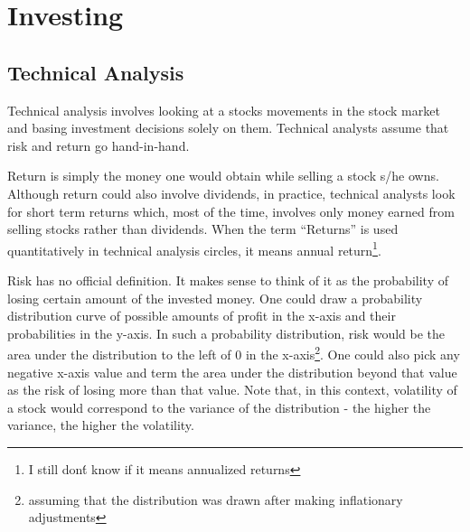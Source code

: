 \chapter{Investing}
\section{Technical Analysis}
Technical analysis involves looking at a stocks movements in the stock market and basing investment decisions solely on them. Technical analysts assume that risk and return go hand-in-hand. 

Return is simply the money one would obtain while selling a stock s/he owns. Although return could also involve dividends, in practice, technical analysts look for short term returns which, most of the time, involves only money earned from selling stocks rather than dividends. When the term ``Returns'' is used quantitatively in technical analysis circles, it means annual return\footnote{I still don\'t know if it means annualized returns}. 

Risk has no official definition. It makes sense to think of it as the probability of losing certain amount of the invested money. One could draw a probability distribution curve of possible amounts of profit in the x-axis and their probabilities in the y-axis. In such a probability distribution, risk would be the area under the distribution to the left of 0 in the x-axis\footnote{assuming that the distribution was drawn after making inflationary adjustments}. One could also pick any negative x-axis value and term the area under the distribution beyond that value as the risk of losing more than that value. Note that, in this context, volatility of a stock would correspond to the variance of the distribution - the higher the variance, the higher the volatility. 

